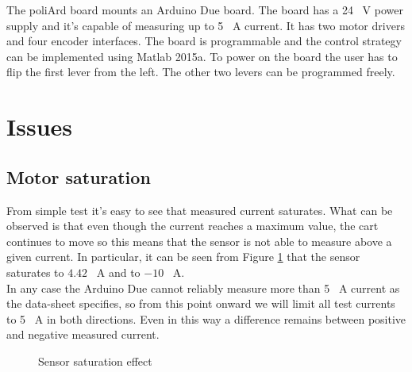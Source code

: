 The poliArd board mounts an Arduino Due board. The board has a 24 \SI{}{\volt} power supply and it’s capable of measuring up to 5 \SI{}{\ampere} current. It has two motor drivers and four encoder interfaces. The board is programmable and the control strategy can be implemented using Matlab 2015a. To power on the board the user has to flip the first lever from the left. The other two levers can be programmed freely.
\section{Issues}
\subsection{Motor saturation}
From simple test it’s easy to see that measured current saturates. What can be observed is that even though the current reaches a maximum value, the cart continues to move so this means that the sensor is not able to measure above a given current. In particular, it can be seen from Figure \ref{fig:sensorsaturation} that the sensor saturates to $4.42$ \SI{}{\ampere} and to $-10$ \SI{}{\ampere}.\\
In any case the Arduino Due cannot reliably measure more than 5 \SI{}{\ampere} current as the data-sheet specifies, so from this point onward we will limit all test currents to 5 \SI{}{\ampere} in both directions. Even in this way a difference remains between positive and negative measured current.  
  \begin{figure}[!h]
  	\centering
  	\caption{Sensor saturation effect}
  	\label{fig:sensorsaturation}
  \end{figure}

